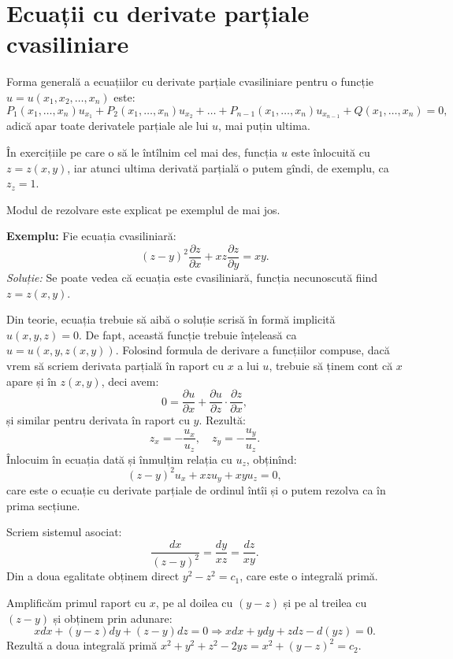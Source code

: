 
\section{Ecuații cu derivate parțiale cvasiliniare}

\indent\indent Forma generală a ecuațiilor cu derivate parțiale cvasiliniare
pentru o funcție $ u = u(x_1, x_2, \dots, x_n) $ este:
\[
  P_1(x_1, \dots, x_n) u_{x_1} + P_2(x_1, \dots, x_n)u_{x_2} + \dots + %
  P_{n-1}(x_1, \dots, x_n) u_{x_{n-1}} + Q(x_1, \dots, x_n) = 0,
\]
adică apar toate derivatele parțiale ale lui $ u $, mai puțin ultima.

În exercițiile pe care o să le întîlnim cel mai des, funcția
$ u $ este înlocuită cu $ z = z(x, y) $, iar atunci ultima derivată
parțială o putem gîndi, de exemplu, ca $ z_z = 1 $.

Modul de rezolvare este explicat pe exemplul de mai jos.

\textbf{Exemplu:} Fie ecuația cvasiliniară:
\[
  (z - y)^2 \dfrac{\partial z}{\partial x} + xz \dfrac{\partial z}{\partial y} = xy.
\]
\emph{Soluție:} Se poate vedea că ecuația este cvasiliniară, funcția
necunoscută fiind $ z = z(x, y) $.

Din teorie, ecuația trebuie să aibă o soluție scrisă în formă implicită
$ u(x, y, z) = 0 $. De fapt, această funcție trebuie înțeleasă ca
$ u = u(x, y, z(x, y)) $. Folosind formula de derivare a funcțiilor compuse,
dacă vrem să scriem derivata parțială în raport cu $ x $ a lui $ u $, trebuie
să ținem cont că $ x $ apare și în $ z(x, y) $, deci avem:
\[
  0 = \dfrac{\partial u}{\partial x} + \dfrac{\partial u}{\partial z} \cdot %
  \dfrac{\partial z}{\partial x},
\]
și similar pentru derivata în raport cu $ y $. Rezultă:
\[
  z_x = -\dfrac{u_x}{u_z}, \quad z_y = -\dfrac{u_y}{u_z}.
\]
Înlocuim în ecuația dată și înmulțim relația cu $ u_z $, obținînd:
\[
  (z - y)^2 u_x + xz u_y + xy u_z = 0,
\]
care este o ecuație cu derivate parțiale de ordinul întîi și o putem rezolva
ca în prima secțiune.

Scriem sistemul asociat:
\[
  \dfrac{dx}{(z - y)^2} = \dfrac{dy}{xz} = \dfrac{dz}{xy}.
\]
Din a doua egalitate obținem direct $ y^2 - z^2 = c_1 $, care este o integrală primă.

Amplificăm primul raport cu $ x $, pe al doilea cu $ (y - z) $ și pe al treilea cu $ (z - y)$ 
și obținem prin adunare:
\[
  xdx + (y - z)dy + (z - y) dz = 0 \Rightarrow xdx + ydy + zdz - d(yz) = 0.
\]
Rezultă a doua integrală primă $ x^2 + y^2 + z^2 - 2yz = x^2 + (y - z)^2 = c_2 $.

